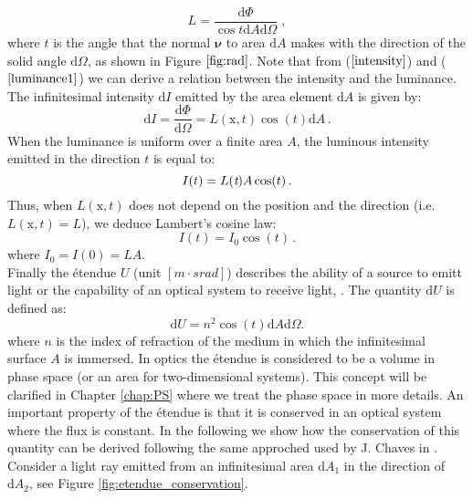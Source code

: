 \begin{equation}\label{luminance1}
  L=\frac{\textrm{d}\Phi}{\cos t\textrm{d}A\textrm{d}\Omega}\;,
\end{equation}
where $t$ is the angle that the normal $\boldsymbol{\nu}$ to area $\textrm{d}A$ makes with the direction of the solid angle $\textrm{d}\Omega$, as shown in Figure $\ref{fig:rad}$.
\noindent Note that from ($\ref{intensity}$) and ($\ref{luminance1}$) we can derive a relation between the intensity and the luminance.\\
The infinitesimal intensity $\textrm{d}I $ emitted by the area element $\textrm{d}A$ is given by:
\begin{equation}
\textrm{d}I = \frac{\textrm{d}\Phi}{\textrm{d}\Omega}= L(\textrm{x},t)\cos(t)\textrm{d}A \,.
\end{equation}
When the luminance is uniform over a finite area $A$, the luminous intensity emitted in the direction $t$ is equal to:
\begin{equation}
I(t) = L(\textit{t}) A \cos(t)\,.
\end{equation}
Thus, when $L(\textrm{x},t)$ does not depend on the position and the direction (i.e. $L(\textrm{x},t)=L$), we deduce Lambert's cosine law:
\begin{equation}
I(t) = I_0\cos(t)\,.
\end{equation}
where $I_0 = I(0) = LA$. \\
Finally the \'{e}tendue $U$ (unit $[m \cdot srad]$) describes the ability of a source to emitt light or the capability of an optical system to receive light, \cite{zhu2011etendue}.
The quantity $ \textrm{d}U $ is defined as:
\begin{equation}\label{etendue}
\textrm{d}U = n^2 \cos(t) \textrm{d}A\textrm{d}\Omega.
\end{equation}
where $n$ is the index of refraction of the medium in which the infinitesimal surface $A$ is immersed. In optics the \'{e}tendue is considered to be a volume in phase space  (or an area for two-dimensional systems). This concept will be clarified in Chapter \ref{chap:PS} where we treat the phase space in more details.
An important property of the \'{e}tendue is that it is conserved in an optical system where the flux is constant. In the following we show how the conservation of this quantity can be derived following the same approched used by J. Chaves in \cite{chaves2015introduction}.
Consider a light ray emitted from an infinitesimal area $\textrm{d}A_1$ in the direction of  $\textrm{d}A_2$,  see Figure \ref{fig:etendue_conservation}.
